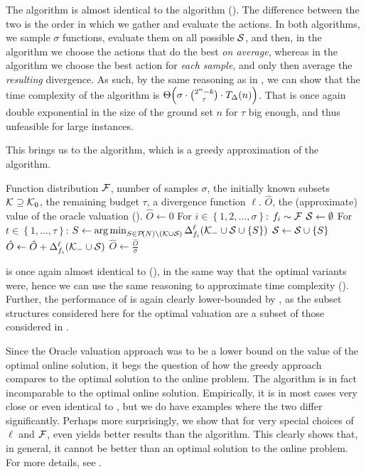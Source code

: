 The \algRO{} algorithm is almost identical to the \algFO{} algorithm ().
The difference between the two is the order in which we gather and evaluate the actions.
In both algorithms, we sample $ \sigma $ functions, evaluate them on all possible $ \s $, and then, in the \algFO{} algorithm we choose the actions that do the best \emph{on average}, whereas in the \algRO{} algorithm we choose the best action for \emph{each sample}, and only then average the \emph{resulting} divergence.
As such, by the same reasoning as in , we can show that the time complexity of the \algRO{} algorithm is $ \fce\Theta{\sigma \cdot \binom{2^n-k}{\tau} \cdot \fce\divt{n}} $.
That is once again double exponential in the size of the ground set $ n $ for $ \tau $ big enough, and thus unfeasible for large instances.

This brings us to the \algRG{} algorithm, which is a greedy approximation of the \algRO{} algorithm.

\begin{algor}{\algRG{}}{Function distribution $ \fdist $, number of samples $ \sigma $, the initially known subsets $ \k \supseteq \k_0 $, the remaining budget $ \tau $, a divergence function $ \ell $.}
  {$ \hat{O} $, the (approximate) value of the oracle valuation ().}
  \State $ \hat{O} \gets 0 $
  \Indent For $ i \in \left\{ 1, 2, \ldots, \sigma \right\} $:
  \State $ f_i \sim \fdist $
  \State $ \s \gets \emptyset $
  \Indent For $ t \in \left\{ 1, \dots, \tau \right\} $:
  \State $ S \gets \argmin_{S \in \pot N \setminus \left( \k \cup \s \right)} \divg[f_i] \ell {\k_- \cup \s \cup \left\{ S \right\}} $
  \State $ \s \gets \s \cup \left\{ S \right\} $
  \EndIndent
  \State $ \hat{O} \gets \hat{O} + \divg[f_i] \ell {\k_- \cup \s} $
  \EndIndent
  \State $ \hat O \gets \frac{\hat O}{\sigma} $
\end{algor}

\algRG{} is once again almost identical to \algFG{} (), in the same way that the optimal variants were, hence we can use the same reasoning to approximate time complexity ().
Further, the performance of \algRG{} is again clearly lower-bounded by \algRO{}, as the subset structures considered here for the optimal valuation are a subset of those considered in \algRO{}.

Since the Oracle valuation approach was to be a lower bound on the value of the optimal online solution, it begs the question of how the greedy approach compares to the optimal solution to the online problem.
The \algRG{} algorithm is in fact incomparable to the optimal online solution.
Empirically, it is in most cases very close or even identical to \algRO{}, but we do have examples where the two differ significantly.
Perhaps more surprisingly, we show that for very special choices of $ \ell $ and $ \fdist $, even \algFG{} yields better results than the \algRG{} algorithm.
This clearly shows that, in general, it cannot be better than an optimal solution to the online problem.
For more details, see .


